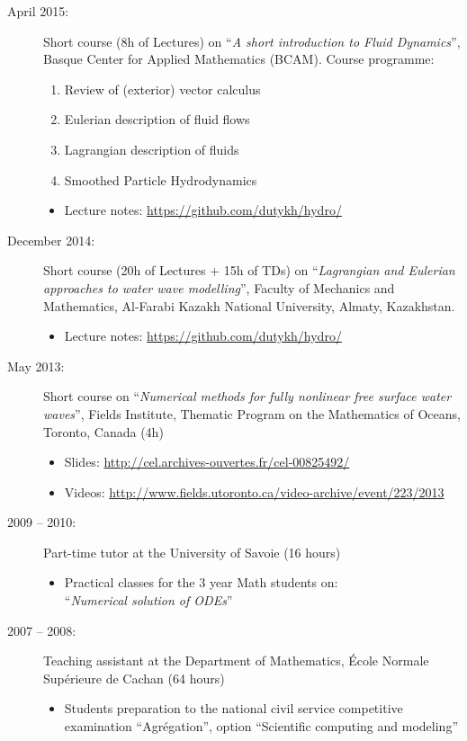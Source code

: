 \documentclass[final, a4paper, oneside, 12pt]{article}
\numberwithin{equation}{section}
\begin{document}
\begin{description}
  \item[April 2015:] Short course (8h of Lectures) on ``\textit{A short introduction to Fluid Dynamics}'', Basque Center for Applied Mathematics (BCAM). Course programme:
  \begin{enumerate}
    \item Review of (exterior) vector calculus
    \item Eulerian description of fluid flows
    \item Lagrangian description of fluids
    \item Smoothed Particle Hydrodynamics
  \end{enumerate}
  \begin{itemize}
    \item Lecture notes: \url{https://github.com/dutykh/hydro/}
  \end{itemize}

  \item[December 2014:] Short course (20h of Lectures + 15h of TDs) on ``\textit{Lagrangian and Eulerian approaches to water wave modelling}'', Faculty of Mechanics and Mathematics, Al-Farabi Kazakh National University, Almaty, Kazakhstan.
  \begin{itemize}
    \item Lecture notes: \url{https://github.com/dutykh/hydro/}
  \end{itemize}
  
  \item[May 2013:] Short course on ``\textit{Numerical methods for fully nonlinear free surface water waves}'', Fields Institute, Thematic Program on the Mathematics of Oceans, Toronto, Canada (4h)
  \begin{itemize}
    \item Slides: \url{http://cel.archives-ouvertes.fr/cel-00825492/}
    \item Videos: \url{http://www.fields.utoronto.ca/video-archive/event/223/2013}
  \end{itemize}
  
  \item[2009 -- 2010:] Part-time tutor at the University of Savoie (16 hours)
  \begin{itemize}
    \item Practical classes for the 3 year Math students on: \\
          ``\textit{Numerical solution of ODEs}''
  \end{itemize}
  
  \item[2007 -- 2008:] Teaching assistant at the Department of Mathematics, \'Ecole Normale Sup\'erieure de Cachan (64 hours)
  \begin{itemize}
    \item Students preparation to the national civil service competitive examination ``Agr\'egation'', option ``Scientific computing and modeling''
    

\end{itemize}
\end{description}
\end{document}
